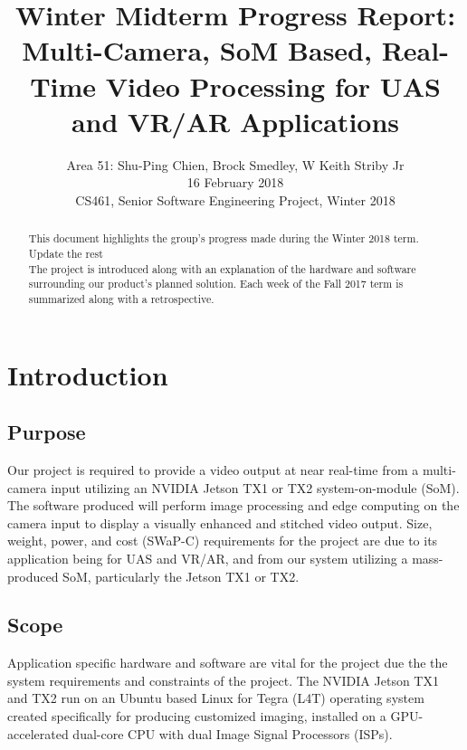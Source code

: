 \documentclass[letterpaper,10pt,serif,draftclsnofoot,onecolumn,compsoc,titlepage]{IEEEtran}
\title{Winter Midterm Progress Report: Multi-Camera, SoM Based, Real-Time Video Processing for UAS and VR/AR Applications}
\author{Area 51: Shu-Ping Chien, Brock Smedley, W Keith Striby Jr \\ 16 February 2018 \\ CS461, Senior Software Engineering Project, Winter 2018}
\begin{document}
\begin{titlepage}
\maketitle

\begin{abstract}

This document highlights the group's progress made during the Winter 2018 term. \\

Update the rest \\

The 
project is introduced along with an explanation of the hardware and software 
surrounding our product's planned solution. Each week of the Fall 2017 term is 
summarized along with a retrospective. \\

\thispagestyle{empty}
\end{abstract}
\end{titlepage}

\newpage
\tableofcontents

\newpage

\section{Introduction}

\subsection{Purpose}
Our project is required to provide a video output at near real-time from a 
multi-camera input utilizing an NVIDIA Jetson TX1 or TX2 system-on-module (SoM). 
The software produced will perform image processing and edge computing on the 
camera input to display a visually enhanced and stitched video output. 
Size, weight, power, and cost (SWaP-C) requirements for the project are due 
to its application being for UAS and VR/AR, and from our system utilizing a 
mass-produced SoM, particularly the Jetson TX1 or TX2. \\

\subsection{Scope}
Application specific hardware and software are vital for the project due the the 
system requirements and constraints of the project.
The NVIDIA Jetson TX1 and TX2 run on an Ubuntu based Linux for Tegra (L4T) operating 
system created specifically for producing customized imaging, installed on a 
GPU-accelerated dual-core CPU with dual Image Signal Processors (ISPs). \\
\end{document}
